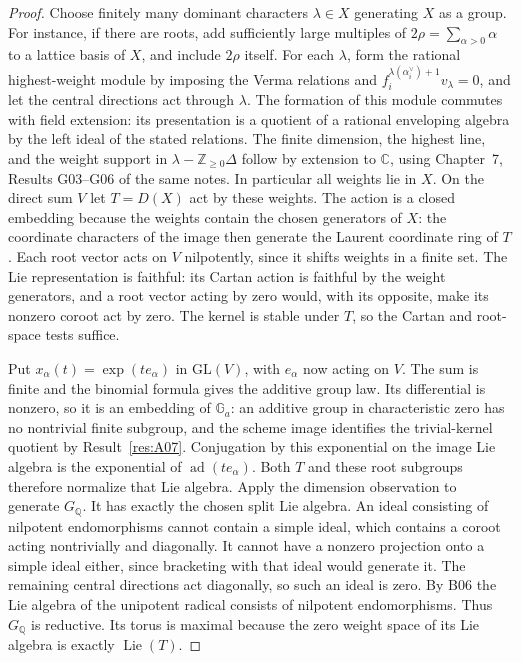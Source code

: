 \documentclass[11pt,a4paper,openany,oneside]{book}
\theoremstyle{resultstyle}
\theoremstyle{definition}
\numberwithin{equation}{chapter}
\newcommand{\Ga}{\mathbb{G}_a}
\newcommand{\GL}{\mathrm{GL}}
\DeclareMathOperator{\Lie}{Lie}
\newcommand{\ZZ}{\mathbb{Z}}
\newcommand{\QQ}{\mathbb{Q}}
\begin{document}
\begin{proof}
Choose finitely many dominant characters \(\lambda\in X\)
generating \(X\) as a group. For instance, if there are roots,
add sufficiently large multiples of \(2\rho=\sum_{\alpha>0}\alpha\)
to a lattice basis of \(X\), and include \(2\rho\) itself.
For each \(\lambda\), form the
rational highest-weight module by imposing the Verma
relations and \(f_i^{\lambda(\alpha_i^\vee)+1}v_\lambda=0\),
and let the central directions act through \(\lambda\).
The formation of this module commutes with field extension:
its presentation is a quotient of a rational enveloping
algebra by the left ideal of the stated relations. The
finite dimension, the highest line, and the weight support
in \(\lambda-\ZZ_{\geq0}\Delta\) follow by extension to
\(\mathbb C\), using Chapter~7, Results G03--G06 of the same
notes. In particular all weights lie in \(X\).
On the direct sum \(V\) let \(T=D(X)\) act by these weights.
The action is a closed embedding because the weights contain
the chosen generators of \(X\): the coordinate characters
of the image then generate the Laurent coordinate ring of
\(T\). Each root vector acts on \(V\) nilpotently, since it
shifts weights in a finite set. The Lie representation is
faithful: its Cartan action is faithful by the weight
generators, and a root vector acting by zero would, with
its opposite, make its nonzero coroot act by zero. The
kernel is stable under \(T\), so the Cartan and root-space
tests suffice.

Put \(x_\alpha(t)=\exp(t e_\alpha)\) in \(\GL(V)\), with
\(e_\alpha\) now acting on \(V\). The sum is finite
and the binomial formula gives the additive group law.
Its differential is nonzero, so it is an embedding
of \(\Ga\): an additive group in characteristic zero
has no nontrivial finite subgroup, and the scheme image
identifies the trivial-kernel quotient by Result~\ref{res:A07}. Conjugation by this exponential
on the image Lie algebra is the exponential of
\(\operatorname{ad}(t e_\alpha)\). Both \(T\) and
these root subgroups therefore normalize that Lie algebra.
Apply the dimension observation to generate \(G_\QQ\).
It has exactly the chosen split Lie algebra. An ideal
consisting of nilpotent endomorphisms cannot contain
a simple ideal, which contains a coroot acting nontrivially
and diagonally. It cannot have a nonzero projection onto a
simple ideal either, since bracketing with that ideal would
generate it. The remaining central directions act diagonally,
so such an ideal is zero. By B06 the Lie algebra of the
unipotent radical consists of nilpotent endomorphisms.
Thus \(G_\QQ\) is reductive. Its torus is maximal because
the zero weight space of its Lie algebra is exactly
\(\Lie(T)\).


\end{proof}
\end{document}
